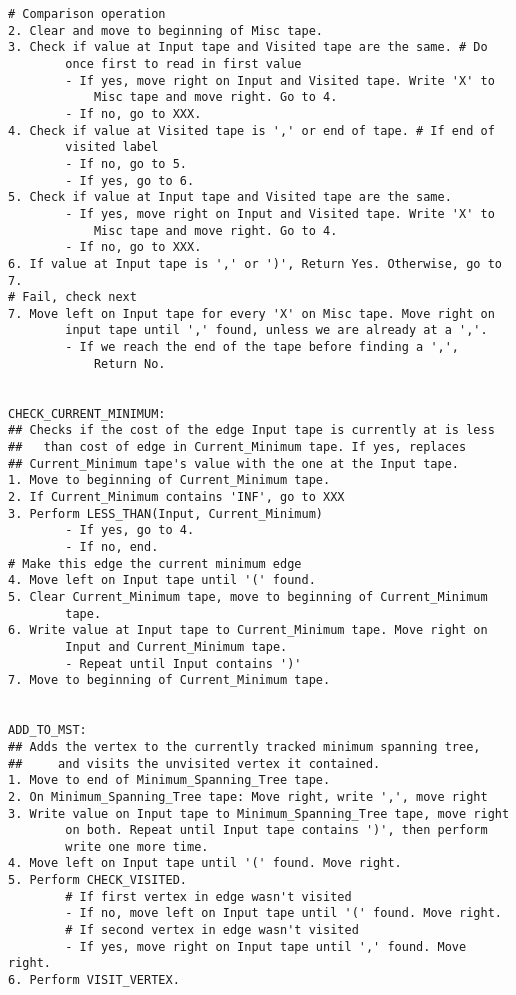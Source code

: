 \documentclass{article}
\begin{document}
\begin{lstlisting}[frame=single]
# Comparison operation
2. Clear and move to beginning of Misc tape.
3. Check if value at Input tape and Visited tape are the same. # Do 
        once first to read in first value
        - If yes, move right on Input and Visited tape. Write 'X' to
            Misc tape and move right. Go to 4.
        - If no, go to XXX.
4. Check if value at Visited tape is ',' or end of tape. # If end of
        visited label
        - If no, go to 5.
        - If yes, go to 6. 
5. Check if value at Input tape and Visited tape are the same.
        - If yes, move right on Input and Visited tape. Write 'X' to
            Misc tape and move right. Go to 4.
        - If no, go to XXX.
6. If value at Input tape is ',' or ')', Return Yes. Otherwise, go to 7.
# Fail, check next
7. Move left on Input tape for every 'X' on Misc tape. Move right on 
        input tape until ',' found, unless we are already at a ','. 
        - If we reach the end of the tape before finding a ',', 
            Return No.


CHECK_CURRENT_MINIMUM:
## Checks if the cost of the edge Input tape is currently at is less 
##   than cost of edge in Current_Minimum tape. If yes, replaces 
## Current_Minimum tape's value with the one at the Input tape.
1. Move to beginning of Current_Minimum tape.
2. If Current_Minimum contains 'INF', go to XXX
3. Perform LESS_THAN(Input, Current_Minimum)
        - If yes, go to 4.
        - If no, end.
# Make this edge the current minimum edge
4. Move left on Input tape until '(' found.
5. Clear Current_Minimum tape, move to beginning of Current_Minimum 
        tape.
6. Write value at Input tape to Current_Minimum tape. Move right on 
        Input and Current_Minimum tape. 
        - Repeat until Input contains ')'  
7. Move to beginning of Current_Minimum tape.


ADD_TO_MST:
## Adds the vertex to the currently tracked minimum spanning tree, 
##     and visits the unvisited vertex it contained.
1. Move to end of Minimum_Spanning_Tree tape.
2. On Minimum_Spanning_Tree tape: Move right, write ',', move right
3. Write value on Input tape to Minimum_Spanning_Tree tape, move right 
        on both. Repeat until Input tape contains ')', then perform
        write one more time.
4. Move left on Input tape until '(' found. Move right.
5. Perform CHECK_VISITED.
        # If first vertex in edge wasn't visited
        - If no, move left on Input tape until '(' found. Move right.
        # If second vertex in edge wasn't visited
        - If yes, move right on Input tape until ',' found. Move right.
6. Perform VISIT_VERTEX.



\end{lstlisting}
\end{document}
